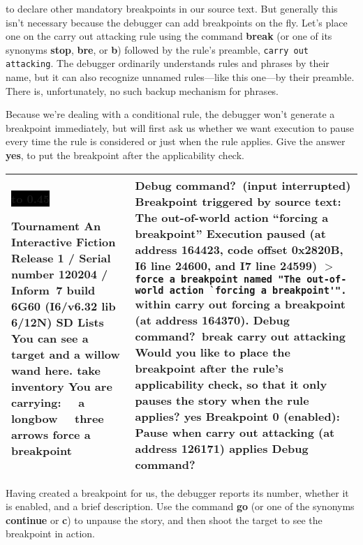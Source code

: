 \documentclass{book}
\newcommand{\n}{\hspace*{\fill}\newline}
\newcommand{\terp}[2]{\begin{center}\begin{tabular}{p{0.45\textwidth}|p{0.45\textwidth}}\midrule #1&#2\\\midrule\end{tabular}\end{center}}
\newcommand{\glkheading}[1]{\textbf{#1}}
\newcommand{\glkinput}[1]{\textbf{#1}}
\newcommand{\glkstatusline}[2]{\centerline{\colorbox{black}{\hbox to 0.45\textwidth{\textcolor{white}{#1\hfil #2}}}}}
\newcommand{\storyprompt}{\raisebox{1.5pt}{\(>\)}}
\newcommand{\cursor}{\raisebox{-1.5pt}{\RectangleThin}}
\newcommand{\markedindent}{\(>\)\qquad}
\begin{document}
\noindent to declare other mandatory breakpoints in our source text.  But
generally this isn't necessary because the debugger can add breakpoints on the
fly.  Let's place one on the carry out attacking rule using the command
\glkinput{break} (or one of its synonyms \glkinput{stop}, \glkinput{bre}, or
\glkinput{b}) followed by the rule's preamble, \lstinline{carry out attacking}.
The debugger ordinarily understands rules and phrases by their name, but it can
also recognize unnamed rules---like this one---by their preamble.  There is,
unfortunately, no such backup mechanism for phrases.

Because we're dealing with a conditional rule, the debugger won't generate a
breakpoint immediately, but will first ask us whether we want execution to pause
every time the rule is considered or just when the rule applies.  Give the
answer \glkinput{yes}, to put the breakpoint after the applicability check.

\terp{\glkstatusline{Lists}{0/2}\n
  \glkheading{Tournament}\n
  An Interactive Fiction\n
  Release 1 / Serial number 120204 / Inform~7 build 6G60 (I6/v6.32 lib 6/12N) SD\n
  \n
  \glkheading{Lists}\n
  You can see a target and a willow wand here.\n
  \n
  \storyprompt\glkinput{take inventory}\n
  You are carrying:\n
  \null\ \ a longbow\n
  \null\ \ three arrows\n
  \n
  \storyprompt\glkinput{force a breakpoint}}{%
  Debug command?\ (input interrupted)\n
  \glkheading{Breakpoint triggered by source text:} The out-of-world action ``forcing a breakpoint''\n
  \n
  Execution paused (at address 164423, code offset 0x2820B, I6 line 24600, and I7 line 24599)\n
  \markedindent \lstinline{force a breakpoint named "The out-of-world action `forcing a breakpoint'".}\n
  within carry out forcing a breakpoint (at address 164370).\n
  \n
  Debug command?\ \glkinput{break carry out attacking}\n
  \n
  Would you like to place the breakpoint after the rule's applicability check, so that it only pauses the story when the rule applies? \glkinput{yes}\n
  \n
  Breakpoint 0 (enabled): Pause when carry out attacking (at address 126171) applies\n
  \n
  Debug command?\ \cursor}

Having created a breakpoint for us, the debugger reports its number, whether it
is enabled, and a brief description.  Use the command \glkinput{go} (or one of
the synonyms \glkinput{continue} or \glkinput{c}) to unpause the story, and then
shoot the target to see the breakpoint in action.
\end{document}

